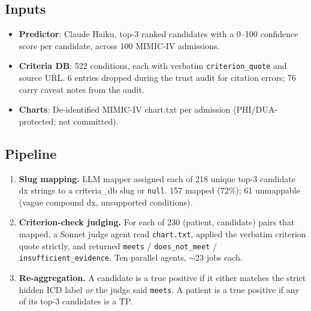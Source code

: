\documentclass[11pt]{article}
\begin{document}
\subsection{Inputs}
\begin{itemize}[leftmargin=*,nosep]
\item \textbf{Predictor}: Claude Haiku, top-3 ranked candidates with a 0--100 confidence
    score per candidate, across 100 MIMIC-IV admissions.
\item \textbf{Criteria DB}: 522 conditions, each with verbatim \texttt{criterion\_quote}
    and source URL. 6 entries dropped during the trust audit for citation errors;
    76 carry caveat notes from the audit.
\item \textbf{Charts}: De-identified MIMIC-IV chart.txt per admission (PHI/DUA-protected;
    not committed).
\end{itemize}

\subsection{Pipeline}
\begin{enumerate}[leftmargin=*,nosep]
\item \textbf{Slug mapping.} LLM mapper assigned each of 218 unique top-3 candidate dx
    strings to a criteria\_db slug or \texttt{null}. 157 mapped (72\%); 61 unmappable
    (vague compound dx, unsupported conditions).
\item \textbf{Criterion-check judging.} For each of 230 (patient, candidate) pairs that
    mapped, a Sonnet judge agent read \texttt{chart.txt}, applied the verbatim criterion
    quote strictly, and returned \texttt{meets} / \texttt{does\_not\_meet} /
    \texttt{insufficient\_evidence}. Ten parallel agents, $\sim$23 jobs each.
\item \textbf{Re-aggregation.} A candidate is a true positive if it either matches the
    strict hidden ICD label \emph{or} the judge said \texttt{meets}. A patient is a
    true positive if any of its top-3 candidates is a TP.
\end{enumerate}
\end{document}
